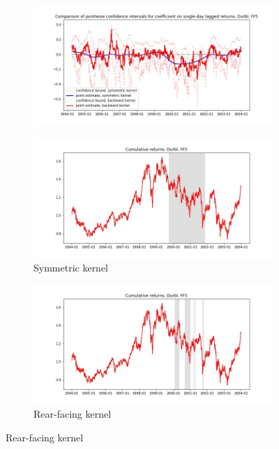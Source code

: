 \documentclass{article}
\begin{document}
\newpage

\begin{figure}

\centering

  \begin{subfigure}[b]{\textwidth}
    \includegraphics[width=\textwidth]{Durbl/pointwiseCIs_layered_FF5.jpg}
    \label{fig:1}
  \end{subfigure}
  \begin{subfigure}[b]{0.45\textwidth}
    \includegraphics[width=\textwidth]{Durbl/full_cumrets_ofint_FF5.jpg}
    \caption*{Symmetric kernel}
    \label{fig:2}
  \end{subfigure}
   \begin{subfigure}[b]{0.45\textwidth}
    \includegraphics[width=\textwidth]{Durbl/bwunif_full_cumrets_ofint_FF5.jpg}
    \caption*{Rear-facing kernel}
    \label{fig:2}
  \end{subfigure}
  
\end{figure}
\end{document}
